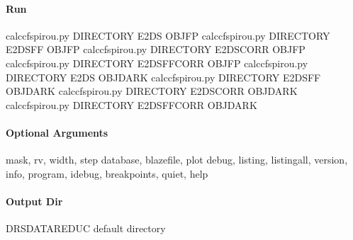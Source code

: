 \documentclass[a4paper,10pt,english]{report}
\begin{document}
\paragraph{Run}
\label{\detokenize{user/spirou/recipes/ccf:run}}
\begin{sphinxVerbatim}[commandchars=\\\{\}]
cal\PYGZus{}ccf\PYGZus{}spirou.py \PYG{o}{[}DIRECTORY\PYG{o}{]} \PYG{o}{[}E2DS  OBJ\PYGZus{}FP\PYG{o}{]}
cal\PYGZus{}ccf\PYGZus{}spirou.py \PYG{o}{[}DIRECTORY\PYG{o}{]} \PYG{o}{[}E2DSFF  OBJ\PYGZus{}FP\PYG{o}{]}
cal\PYGZus{}ccf\PYGZus{}spirou.py \PYG{o}{[}DIRECTORY\PYG{o}{]} \PYG{o}{[}E2DS\PYGZus{}CORR  OBJ\PYGZus{}FP\PYG{o}{]}
cal\PYGZus{}ccf\PYGZus{}spirou.py \PYG{o}{[}DIRECTORY\PYG{o}{]} \PYG{o}{[}E2DSFF\PYGZus{}CORR  OBJ\PYGZus{}FP\PYG{o}{]}
cal\PYGZus{}ccf\PYGZus{}spirou.py \PYG{o}{[}DIRECTORY\PYG{o}{]} \PYG{o}{[}E2DS  OBJ\PYGZus{}DARK\PYG{o}{]}
cal\PYGZus{}ccf\PYGZus{}spirou.py \PYG{o}{[}DIRECTORY\PYG{o}{]} \PYG{o}{[}E2DSFF  OBJ\PYGZus{}DARK\PYG{o}{]}
cal\PYGZus{}ccf\PYGZus{}spirou.py \PYG{o}{[}DIRECTORY\PYG{o}{]} \PYG{o}{[}E2DS\PYGZus{}CORR  OBJ\PYGZus{}DARK\PYG{o}{]}
cal\PYGZus{}ccf\PYGZus{}spirou.py \PYG{o}{[}DIRECTORY\PYG{o}{]} \PYG{o}{[}E2DSFF\PYGZus{}CORR  OBJ\PYGZus{}DARK\PYG{o}{]}
\end{sphinxVerbatim}


\paragraph{Optional Arguments}
\label{\detokenize{user/spirou/recipes/ccf:optional-arguments}}
\begin{sphinxVerbatim}[commandchars=\\\{\}]
\PYGZhy{}\PYGZhy{}mask, \PYGZhy{}\PYGZhy{}rv, \PYGZhy{}\PYGZhy{}width, \PYGZhy{}\PYGZhy{}step
\PYGZhy{}\PYGZhy{}database, \PYGZhy{}\PYGZhy{}blazefile, \PYGZhy{}\PYGZhy{}plot
\PYGZhy{}\PYGZhy{}debug, \PYGZhy{}\PYGZhy{}listing, \PYGZhy{}\PYGZhy{}listingall, \PYGZhy{}\PYGZhy{}version, \PYGZhy{}\PYGZhy{}info,
\PYGZhy{}\PYGZhy{}program, \PYGZhy{}\PYGZhy{}idebug, \PYGZhy{}\PYGZhy{}breakpoints, \PYGZhy{}\PYGZhy{}quiet, \PYGZhy{}\PYGZhy{}help
\end{sphinxVerbatim}


\paragraph{Output Dir}
\label{\detokenize{user/spirou/recipes/ccf:output-dir}}
\begin{sphinxVerbatim}[commandchars=\\\{\}]
DRS\PYGZus{}DATA\PYGZus{}REDUC    default  directory
\end{sphinxVerbatim}
\end{document}
